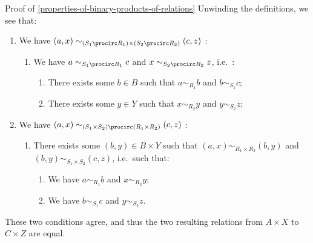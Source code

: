 \begin{Proof}{Proof of \cref{properties-of-binary-products-of-relations}}
    Unwinding the definitions, we see that:
    \begin{enumerate}
        \item We have $(a,x)\sim_{(S_{1}\procirc R_{1})\times(S_{2}\procirc R_{2})}(c,z)$ \textiff:
            \begin{enumerate}
                \item We have $a\sim_{S_{1}\procirc R_{1}}c$ and $x\sim_{S_{2}\procirc R_{2}}z$, i.e.\ \textiff:
                    \begin{enumerate}
                        \item There exists some $b\in B$ such that $a\sim_{R_{1}}b$ and $b\sim_{S_{1}}c$;
                        \item There exists some $y\in Y$ such that $x\sim_{R_{2}}y$ and $y\sim_{S_{2}}z$;
                    \end{enumerate}
            \end{enumerate}
        \item We have $(a,x)\sim_{(S_{1}\times S_{2})\procirc(R_{1}\times R_{2})}(c,z)$ \textiff:
            \begin{enumerate}
                \item There exists some $(b,y)\in B\times Y$ such that $(a,x)\sim_{R_{1}\times R_{2}}(b,y)$ and $(b,y)\sim_{S_{1}\times S_{2}}(c,z)$, i.e.\ such that:
                    \begin{enumerate}
                        \item We have $a\sim_{R_{1}}b$ and $x\sim_{R_{2}}y$;
                        \item We have $b\sim_{S_{1}}c$ and $y\sim_{S_{2}}z$.
                    \end{enumerate}
            \end{enumerate}
    \end{enumerate}
    These two conditions agree, and thus the two resulting relations from $A\times X$ to $C\times Z$ are equal.
\end{Proof}
